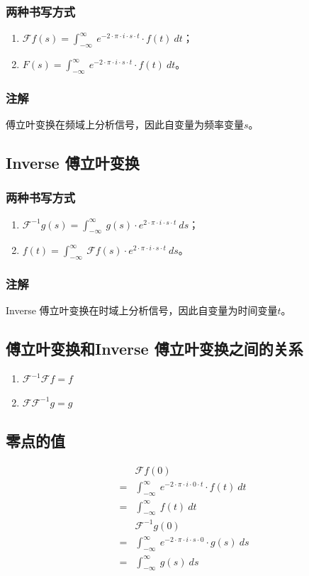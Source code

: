 \subsubsection{两种书写方式}
\begin{enumerate}
	\item $\mathcal{F}f(s)=\int_{-\infty}^{\infty}\ e^{-2\cdot \pi\cdot i\cdot s\cdot t}\cdot f(t)\ dt$；
	\item $F(s)=\int_{-\infty}^{\infty}\ e^{-2\cdot \pi\cdot i\cdot s\cdot t}\cdot f(t)\ dt$。
\end{enumerate}
\subsubsection{注解}
傅立叶变换在频域上分析信号，因此自变量为频率变量$s$。
\subsection{Inverse 傅立叶变换}
\subsubsection{两种书写方式}
\begin{enumerate}
	\item $\mathcal{F}^{-1}g(s)=\int_{-\infty}^{\infty}\ g(s)\cdot e^{2\cdot \pi\cdot i\cdot s\cdot t}\ ds$；
	\item $f(t)=\int_{-\infty}^{\infty}\ \mathcal{F}f(s)\cdot e^{2\cdot \pi\cdot i\cdot s\cdot t}\ ds$。
\end{enumerate}
\subsubsection{注解}
Inverse 傅立叶变换在时域上分析信号，因此自变量为时间变量$t$。
\subsection{傅立叶变换和Inverse 傅立叶变换之间的关系}
\begin{enumerate}
	\item $\mathcal{F}^{-1}\mathcal{F}f=f$
	\item $\mathcal{F}\mathcal{F}^{-1}g=g$
\end{enumerate}
\subsection{零点的值}
\begin{align*}
	  & \mathcal{F}f(0)                                                             \\
	= & \int_{-\infty}^{\infty}\ e^{-2\cdot \pi\cdot i\cdot 0\cdot t}\cdot f(t)\ dt \\
	= & \int_{-\infty}^{\infty}\ f(t)\ dt                                           \\
	  & \mathcal{F}^{-1}g(0)                                                        \\
	= & \int_{-\infty}^{\infty}\ e^{-2\cdot \pi\cdot i\cdot s\cdot 0}\cdot g(s)\ ds \\
	= & \int_{-\infty}^{\infty}\ g(s)\ ds
\end{align*}
